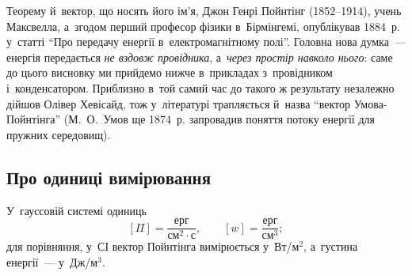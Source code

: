 \begin{Historical}
	Теорему й~вектор, що носять його ім'я, Джон Генрі Пойнтінг (1852--1914), учень
	Максвелла, а~згодом перший професор фізики в~Бірмінгемі, опублікував 1884~р. у~статті
	\enquote{Про передачу енергії в~електромагнітному полі}. Головна нова думка~---
	енергія передається \emph{не вздовж провідника}, а~\emph{через простір навколо
	нього}: саме до цього висновку ми прийдемо нижче в~прикладах з~провідником
	і~конденсатором. Приблизно в~той самий час до такого ж результату незалежно дійшов
	Олівер Хевісайд, тож у~літературі трапляється й~назва \enquote{вектор Умова-Пойнтінга}
	(М.~О.~Умов ще 1874~р. запровадив поняття потоку енергії для пружних середовищ).
\end{Historical}


\subsection*{Про одиниці вимірювання}


У~гауссовій системі одиниць
\begin{equation*}
	\left[\Pi\right] = \frac{\text{ерг}}{\text{см}^2\cdot\text{с}}, \qquad \left[w\right] = \frac{\text{ерг}}{\text{см}^3};
\end{equation*}
для порівняння, у~СІ вектор Пойнтінга вимірюється у~Вт/м$^2$, а~густина енергії~---
у~Дж/м$^3$.

